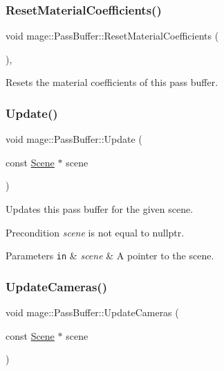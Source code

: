 \subsubsection{\texorpdfstring{Reset\+Material\+Coefficients()}{ResetMaterialCoefficients()}}
{\footnotesize\ttfamily void mage\+::\+Pass\+Buffer\+::\+Reset\+Material\+Coefficients (\begin{DoxyParamCaption}{ }\end{DoxyParamCaption})\hspace{0.3cm}{\ttfamily [private]}, {\ttfamily [noexcept]}}

Resets the material coefficients of this pass buffer. \hypertarget{structmage_1_1_pass_buffer_a6b73eb28fac15b121ff013b03ab643f8}{}\label{structmage_1_1_pass_buffer_a6b73eb28fac15b121ff013b03ab643f8} 
\subsubsection{\texorpdfstring{Update()}{Update()}}
{\footnotesize\ttfamily void mage\+::\+Pass\+Buffer\+::\+Update (\begin{DoxyParamCaption}\item[{const \hyperlink{classmage_1_1_scene}{Scene} $\ast$}]{scene }\end{DoxyParamCaption})}

Updates this pass buffer for the given scene.

\begin{DoxyPrecond}{Precondition}
{\itshape scene} is not equal to {\ttfamily nullptr}. 
\end{DoxyPrecond}

\begin{DoxyParams}[1]{Parameters}
\mbox{\tt in}  & {\em scene} & A pointer to the scene. \\
\hline
\end{DoxyParams}
\hypertarget{structmage_1_1_pass_buffer_a1ded2ce7cadbcb176aec69a85ba81c3e}{}\label{structmage_1_1_pass_buffer_a1ded2ce7cadbcb176aec69a85ba81c3e} 
\subsubsection{\texorpdfstring{Update\+Cameras()}{UpdateCameras()}}
{\footnotesize\ttfamily void mage\+::\+Pass\+Buffer\+::\+Update\+Cameras (\begin{DoxyParamCaption}\item[{const \hyperlink{classmage_1_1_scene}{Scene} $\ast$}]{scene }\end{DoxyParamCaption})\hspace{0.3cm}{\ttfamily [private]}}


